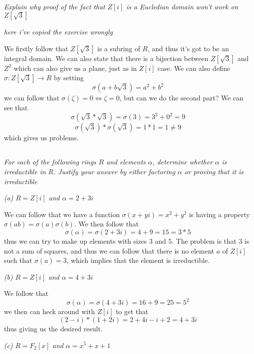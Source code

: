 \documentclass[11pt,oneside,titlepage]{book}
\DeclareMathOperator \lra {\Leftrightarrow}
\begin{document}
\subsection{}

\textit{Explain why proof of the fact that $Z[i]$ is a Eucledian domain
  won't work on $Z[\sqrt{3}]$ }

\textit{here i've copied the exercise wrongly}

We firstly follow that $Z[\sqrt{3}]$ is a subring of $R$, and thus
it's got to be an integral domain. We can also state that
there is a bijection between $Z[\sqrt{3}]$ and $Z^2$ which
can also give us a plane, just as in $Z[i]$ case. We can also define
$\sigma: Z[\sqrt{3}] \to R$ by setting
$$\sigma(a + b \sqrt{3}) = a^2 + b^2$$
we can follow that $\sigma(\zeta) = 0 \lra \zeta = 0$, but can we do the
second part? We can see that
$$\sigma(\sqrt{3} * \sqrt{3}) = \sigma(3) = 3^2 + 0^2 = 9$$
$$\sigma(\sqrt{3}) * \sigma(\sqrt{3}) = 1 * 1 = 1 \neq 9$$
which gives us problems.

\subsection{}

\textit{For each of the following rings $R$ and elements $\alpha$,
  determine whether $\alpha$ is irreductible in $R$. Justify
  your answer by either factoring $\alpha$ or proving that it is
  irreductible}

\textit{(a) $R = Z[i]$ and $\alpha = 2 + 3i$}

We can follow that we have a function $\sigma(x + yi) = x^2 + y^2$ is
having a property $\sigma(ab) = \sigma(a)\sigma(b)$. We then follow that
$$\sigma(\alpha) = \sigma(2 + 3i) = 4 + 9 = 15 = 3 * 5$$
thus we can try to make up elements with sizes $3$ and $5$. The problem is
that $3$ is not a sum of squares, and thus we can follow that there is
no element $a$ of $Z[i]$ such that $\sigma(a) = 3$, which implies that the
element is irreductible.

\textit{(b) $R = Z[i]$ and $\alpha = 4 + 3i$}

We follow that
$$\sigma(\alpha) = \sigma(4 + 3i) = 16 + 9 = 25 = 5^2$$
we then can heck around with $Z[i]$ to get that
$$(2 - i) * (1 + 2i) = 2 + 4i - i + 2 = 4 + 3i$$
thus giving us the desired result.

\textit{(c) $R = F_2[x]$ and $\alpha = x^5 + x + 1$}
\end{document}
